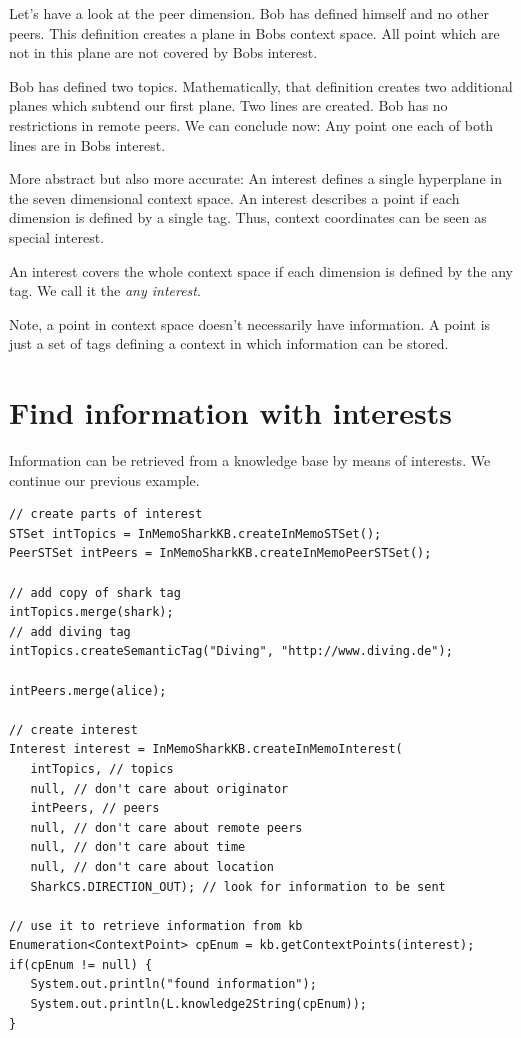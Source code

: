 Let's have a look at the peer dimension. Bob has defined himself and no other peers. This definition creates a plane in Bobs context space. All point which are not in this plane are not covered by Bobs interest.

Bob has defined two topics. Mathematically, that definition creates two additional planes which subtend our first plane. Two lines are created. Bob has no restrictions in remote peers. We can conclude now: Any point one each of both lines are in Bobs interest. 

More abstract but also more accurate: An interest defines a single hyperplane in the seven dimensional context space. An interest describes a point if each dimension is defined by a single tag. Thus, context coordinates can be seen as special interest.

An interest covers the whole context space if each dimension is defined by the any tag. We call it the {\it any interest}.

Note, a point in context space doesn't necessarily have information. A point is just a set of tags defining a context in which information can be stored.

\section{Find information with interests}
Information can be retrieved from a knowledge base by means of interests.
We continue our previous example.

\begin{verbatim}
// create parts of interest
STSet intTopics = InMemoSharkKB.createInMemoSTSet();
PeerSTSet intPeers = InMemoSharkKB.createInMemoPeerSTSet();

// add copy of shark tag
intTopics.merge(shark);
// add diving tag
intTopics.createSemanticTag("Diving", "http://www.diving.de");

intPeers.merge(alice);

// create interest
Interest interest = InMemoSharkKB.createInMemoInterest(
   intTopics, // topics
   null, // don't care about originator
   intPeers, // peers
   null, // don't care about remote peers
   null, // don't care about time
   null, // don't care about location
   SharkCS.DIRECTION_OUT); // look for information to be sent

// use it to retrieve information from kb
Enumeration<ContextPoint> cpEnum = kb.getContextPoints(interest);
if(cpEnum != null) {
   System.out.println("found information");
   System.out.println(L.knowledge2String(cpEnum));
}
\end{verbatim}

